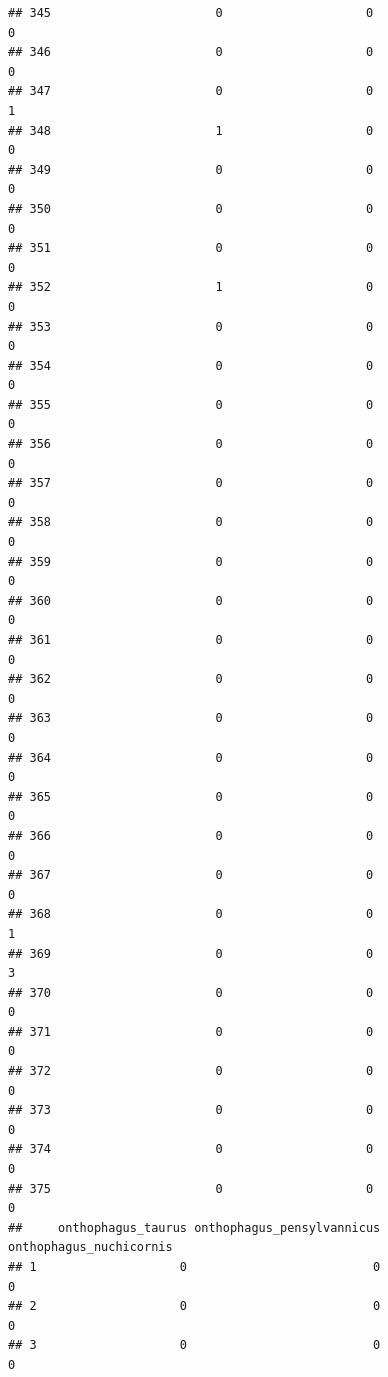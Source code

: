 \documentclass[
]{article}
\begin{document}
\begin{verbatim}
## 345                       0                    0                      0
## 346                       0                    0                      0
## 347                       0                    0                      1
## 348                       1                    0                      0
## 349                       0                    0                      0
## 350                       0                    0                      0
## 351                       0                    0                      0
## 352                       1                    0                      0
## 353                       0                    0                      0
## 354                       0                    0                      0
## 355                       0                    0                      0
## 356                       0                    0                      0
## 357                       0                    0                      0
## 358                       0                    0                      0
## 359                       0                    0                      0
## 360                       0                    0                      0
## 361                       0                    0                      0
## 362                       0                    0                      0
## 363                       0                    0                      0
## 364                       0                    0                      0
## 365                       0                    0                      0
## 366                       0                    0                      0
## 367                       0                    0                      0
## 368                       0                    0                      1
## 369                       0                    0                      3
## 370                       0                    0                      0
## 371                       0                    0                      0
## 372                       0                    0                      0
## 373                       0                    0                      0
## 374                       0                    0                      0
## 375                       0                    0                      0
##     onthophagus_taurus onthophagus_pensylvannicus onthophagus_nuchicornis
## 1                    0                          0                       0
## 2                    0                          0                       0
## 3                    0                          0                       0

\end{verbatim}
\end{document}
